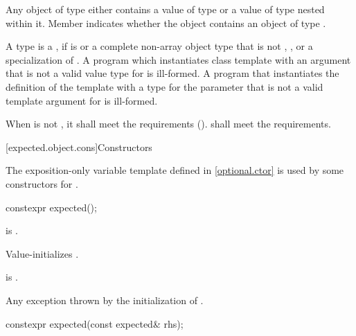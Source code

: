 \pnum
Any object of type  either
contains a value of type  or
a value of type 
nested within it.
Member  indicates whether the  object
contains an object of type .

\pnum
A type  is a ,
if  is 
or a complete non-array object type that is not ,
,
or a specialization of .
A program which instantiates class template 
with an argument  that is not a valid value
type for  is ill-formed.
A program that instantiates
the definition of the template 
with a type for the  parameter
that is not a valid template argument for  is ill-formed.

\pnum
When  is not \cv{} , it shall meet
the  requirements ().
 shall meet
the  requirements.

[expected.object.cons]{Constructors}

\pnum
The exposition-only variable template 
defined in \ref{optional.ctor}
is used by some constructors for .

%
\begin{itemdecl}
constexpr expected();
\end{itemdecl}

\begin{itemdescr}
\pnum
\constraints
{} is .

\pnum
\effects
Value-initializes .

\pnum
\ensures
{} is .

\pnum
\throws
Any exception thrown by the initialization of .
\end{itemdescr}

%
\begin{itemdecl}
constexpr expected(const expected& rhs);
\end{itemdecl}

